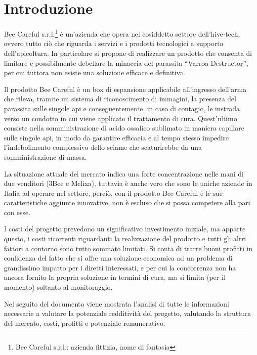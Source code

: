\section{Introduzione}
Bee Careful s.r.l.\footnote{Bee Careful s.r.l.: azienda fittizia, nome di
fantasia} è un’azienda che opera nel cosiddetto settore dell’hive-tech, ovvero
tutto ciò che riguarda i servizi e i prodotti tecnologici a supporto
dell’apicoltura. In particolare si propone di realizzare un prodotto che
consenta di limitare e possibilmente debellare la minaccia del parassita “Varroa
Destructor”, per cui tuttora non esiste una soluzione efficace e definitiva.

Il prodotto Bee Careful è un box di espansione applicabile all’ingresso
dell’arnia che rileva, tramite un sistema di riconoscimento di immagini, la
presenza del parassita sulle singole api e conseguentemente, in caso di
contagio, le instrada verso un condotto in cui viene applicato il
trattamento di cura. Quest’ultimo consiste nella somministrazione di acido
ossalico sublimato in maniera capillare sulle singole api, in modo da garantire
efficacia e al tempo stesso impedire l’indebolimento complessivo dello sciame
che scaturirebbe da una  somministrazione di massa.

La situazione attuale del mercato indica una forte concentrazione nelle mani di
due venditori (3Bee e Melixa), tuttavia è anche vero che sono le uniche aziende
in Italia ad operare nel settore, perciò, con il prodotto Bee Careful e le sue
caratteristiche aggiunte innovative, non è escluso che si possa competere alla
pari con esse.

I costi del progetto prevedono un significativo investimento iniziale, ma
apparte questo, i costi ricorrenti riguardanti la realizzazione del prodotto e
tutti gli altri fattori a contorno sono tutto sommato limitati. Si conta di
trarre buoni profitti in confidenza del fatto che si offre una soluzione
economica ad un problema di grandissimo impatto per i diretti interessati, e per
cui la concorrenza non ha ancora fornito la propria soluzione in termini di
cura, ma si limita (per il momento) soltanto al monitoraggio.

Nel seguito del documento viene mostrata l’analisi di tutte le informazioni
necessarie a valutare la potenziale redditività del progetto, valutando la
struttura del mercato, costi, profitti e potenziale remunerativo.

